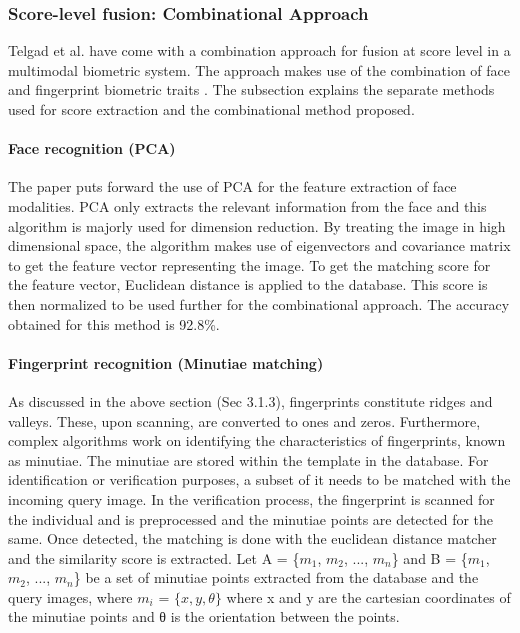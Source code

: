 \documentclass[a4paper, 12pt]{article}
\begin{document}
\subsubsection{Score-level fusion: Combinational Approach}
Telgad et al. have come with a combination approach for fusion at score level in a multimodal biometric system. The approach makes use of the combination of face and fingerprint biometric traits \cite{telgad:2014}. The subsection explains the separate methods used for score extraction and the combinational method proposed.
\noindent\paragraph{Face recognition (PCA)} 
\noindent The paper puts forward the use of PCA for the feature extraction of face modalities. PCA only extracts the relevant information from the face and this algorithm is majorly used for dimension reduction. 
\vskip 0.2in
\noindent By treating the image in high dimensional space, the algorithm makes use of eigenvectors and covariance matrix to get the feature vector representing the image. To get the matching score for the feature vector, Euclidean distance is applied to the database. This score is then normalized to be used further for the combinational approach. The accuracy obtained for this method is 92.8\%.
\noindent\paragraph{Fingerprint recognition (Minutiae matching)} 
\noindent As discussed in the above section (Sec 3.1.3), fingerprints constitute ridges and valleys. These, upon scanning, are converted to ones and zeros.  Furthermore, complex algorithms work on identifying the characteristics of fingerprints, known as minutiae. The minutiae are stored within the template in the database. For identification or verification purposes, a subset of it needs to be matched with the incoming query image.
\vskip 0.2in
\noindent In the verification process, the fingerprint is scanned for the individual and is preprocessed and the minutiae points are detected for the same. Once detected, the matching is done with the euclidean distance matcher and the similarity score is extracted. Let A = \{$m_1$, $m_2$, ..., $m_n$\} and B = \{$m_1$, $m_2$, ..., $m_n$\} be a set of minutiae points extracted from the database and the query images, where $m_i$ = $\{x, y, θ\}$ where x and y are the cartesian coordinates of the minutiae points and θ is the orientation between the points.
\end{document}

